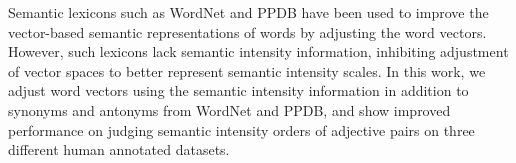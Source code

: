 Semantic lexicons such as WordNet and PPDB have been used to improve the vector-based semantic representations of words by adjusting the word vectors. However, such lexicons lack semantic intensity information, inhibiting adjustment of vector spaces to better represent semantic intensity scales. In this work, we adjust word vectors using the semantic intensity information in addition to synonyms and antonyms from WordNet and PPDB, and show improved performance on judging semantic intensity orders of adjective pairs on three different human annotated datasets.
